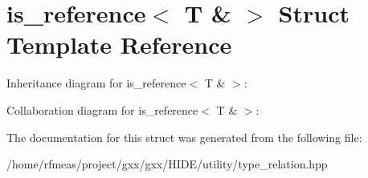 \hypertarget{structis__reference_3_01T_01_6_01_4}{}\section{is\+\_\+reference$<$ T \& $>$ Struct Template Reference}
\label{structis__reference_3_01T_01_6_01_4}


Inheritance diagram for is\+\_\+reference$<$ T \& $>$\+:


Collaboration diagram for is\+\_\+reference$<$ T \& $>$\+:


The documentation for this struct was generated from the following file\+:\begin{DoxyCompactItemize}
\item 
/home/rfmeas/project/gxx/gxx/\+H\+I\+D\+E/utility/type\+\_\+relation.\+hpp\end{DoxyCompactItemize}

